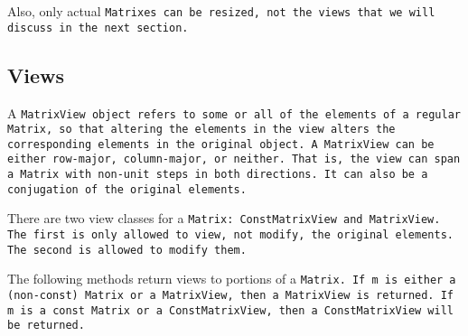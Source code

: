 Also, only actual \tt{Matrix}es can be resized, not the views that we will discuss in the next section.

\subsection{Views}
\label{Matrix_Views}

A \tt{MatrixView} object refers to some or all of the elements of a regular \tt{Matrix},
so that altering the elements in the view alters the
corresponding elements in the original object.  A \tt{MatrixView}
can be either row-major, column-major, or neither.  That is, the view can 
span a \tt{Matrix} with non-unit steps in both directions.
It can also be a conjugation of the original
elements.

There are two view classes for
a \tt{Matrix}:
\tt{ConstMatrixView} and \tt{MatrixView}.  
The first is only allowed to view,
not modify, the original elements.  The second is allowed to modify them.

The following methods return views to portions of a \tt{Matrix}.
If \tt{m} is either a (non-\tt{const}) \tt{Matrix}
or a \tt{MatrixView}, then a \tt{MatrixView} is returned.
If \tt{m} is a \tt{const Matrix} or a \tt{ConstMatrixView},
then a \tt{ConstMatrixView} will be returned. 

